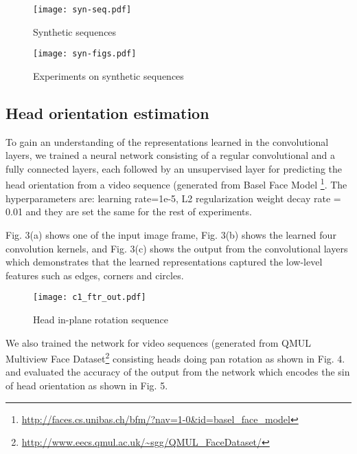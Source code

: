 \documentclass{article}
\begin{document}
\begin{figure}[h]
\begin{center}
\centerline{\texttt{[image: syn-seq.pdf]}}
\caption{Synthetic sequences}
\label{syn}
\end{center}
\vskip -0.2in
\end{figure}

\begin{figure}[h]
\begin{center}
\centerline{\texttt{[image: syn-figs.pdf]}}
\caption{Experiments on synthetic sequences}
\label{syn2}
\end{center}
\vskip -0.2in
\end{figure}

\subsection{Head orientation estimation}
To gain an understanding of the representations learned in the convolutional 
layers, 
we trained a neural network consisting of a regular convolutional and a fully 
connected layers, each followed by an unsupervised layer for predicting the 
head orientation from a video sequence (generated from Basel Face Model
\footnote{\url{http://faces.cs.unibas.ch/bfm/?nav=1-0&id=basel_face_model}}.
The hyperparameters are: learning rate=1e-5, L2 regularization weight decay rate = 0.01 and they are set the same for the rest of experiments.

Fig. 3(a) shows one of the input image 
frame, Fig. 3(b) shows the learned four convolution kernels, and Fig. 3(c) shows the output from the convolutional layers which demonstrates that the learned 
representations captured the low-level features such as edges, corners and 
circles. 

\begin{figure}[h]
\begin{center}
\centerline{\texttt{[image: c1\_ftr\_out.pdf]}}
\caption{Head in-plane rotation sequence}
\label{head}
\end{center}
\vskip -0.2in
\end{figure}

We also trained the network for video sequences (generated from QMUL Multiview 
Face Dataset\footnote{\url{http://www.eecs.qmul.ac.uk/~sgg/QMUL_FaceDataset/}} consisting heads doing pan 
rotation as shown in Fig. 4. and evaluated the accuracy of the output from the 
network which encodes the sin of head orientation as shown in Fig. 5.
\end{document}
